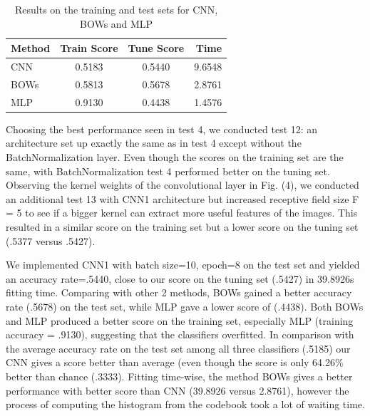 \documentclass{article}
\begin{document}
\begin{table}[h!]
 \caption{Results on the training and test sets for CNN, BOWs and MLP}
 \label{tab:format-se}
 \vskip 0.15in
 \begin{center}
 \begin{small}
 \begin{sc}
 \begin{tabular}{lccr}
 \hline
 \abovespace\belowspace
Method & Train Score & Tune Score & Time\\
\hline
\abovespace\belowspace
CNN & 0.5183 & 0.5440 & 9.6548\\
\hline
\abovespace\belowspace
BOWs & 0.5813 & 0.5678 & 2.8761\\
\hline
\abovespace\belowspace
MLP & 0.9130 & 0.4438 & 1.4576\\
\hline
 \end{tabular}
 \end{sc}
 \end{small}
 \end{center}
 \vskip -0.1in
\end{table}

Choosing the best performance seen in test 4, we conducted test 12: an
architecture set up exactly the same as in test 4 except without the
BatchNormalization layer. Even though the scores on the training set
are the same, with BatchNormalization test 4 performed better on the
tuning set. Observing the kernel weights of the convolutional layer in
Fig. (4), we conducted an additional test 13 with CNN1 architecture but increased receptive field size F = 5 to see if a bigger kernel can extract more useful features of the images. This resulted in a similar score on the training set but a lower score on the tuning set (.5377 versus .5427). 


We implemented CNN1 with batch size=10, epoch=8 on the test set and yielded an accuracy rate=.5440, close to our score on the tuning set (.5427) in 39.8926s fitting time. Comparing with other 2 methods, BOWs gained a better accuracy rate (.5678) on the test set, while MLP gave a lower score of (.4438). Both BOWs and MLP produced a better score on the training set, especially MLP (training accuracy = .9130), suggesting that the classifiers overfitted. In comparison with the average accuracy rate on the test set among all three classifiers (.5185) our CNN gives a score better than average (even though the score is only 64.26\% better than chance (.3333). Fitting time-wise, the method BOWs gives a better performance with better score than CNN (39.8926 versus 2.8761), however the process of computing the histogram from the codebook took a lot of waiting time. 
\end{document}

